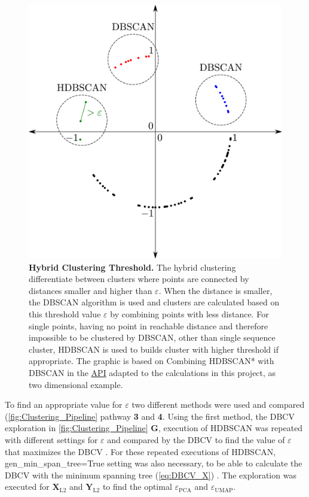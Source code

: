 \begin{figure}[!hbt]
    \centering
    \includegraphics[width=\textwidth]{Graphics/Hybrid.pdf}
    \caption[Hybrid Clustering Threshold]{\textbf{Hybrid Clustering Threshold.} The hybrid clustering differentiate between clusters where points are connected by distances smaller and higher than $\varepsilon$. When the distance is smaller, the \gls{DBSCAN} algorithm is used and clusters are calculated based on this threshold value $\varepsilon$ by combining points with less distance. For single points, having no point in reachable distance and therefore impossible to be clustered by \gls{DBSCAN}, other than single sequence cluster, \gls{HDBSCAN} is used to builds cluster with higher threshold if appropriate. The graphic is based on \glqq Combining HDBSCAN* with DBSCAN\grqq{} in the \href{https://hdbscan.readthedocs.io/en/latest/api.html}{API} adapted to the calculations in this project, as two dimensional example.}
    \label{fig:Hybrid}
\end{figure}

To find an appropriate value for $\varepsilon$ two different methods were used and compared (\autoref{fig:Clustering_Pipeline} pathway \textsf{\textbf{3}} and \textsf{\textbf{4}}. Using the first method, the \gls{DBCV} exploration in \autoref{fig:Clustering_Pipeline} \textsf{\textbf{G}}, execution of \gls{HDBSCAN} was repeated with different settings for $\varepsilon$ and compared by the \gls{DBCV} to find the value of $\varepsilon$ that maximizes the \gls{DBCV} \autocite{moulavi_density-based_2014}. For these repeated executions of \gls{HDBSCAN}, \colorbox{backcolour}{gen\_min\_span\_tree=True} setting was also necessary, to be able to calculate the \gls{DBCV} with the minimum spanning tree (\autoref{eq:DBCV_X}) \autocite{moulavi_density-based_2014, gower_minimum_1969}. The exploration was executed for $\mathbf{X}_{\text{L2}}$ and $\mathbf{Y}_{\text{L2}}$ to find the optimal $\varepsilon_{\text{PCA}}$ and $\varepsilon_{\text{UMAP}}$.

